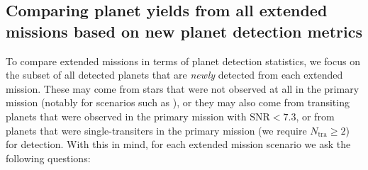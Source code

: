 \subsection{Comparing planet yields from all extended missions based on new planet detection metrics}
\label{sec:results_from_all_extended_missions}
To compare extended missions in terms of planet detection statistics, we focus on the subset of all detected planets that are \textit{newly} detected from each extended mission.
These may come from stars that were not observed at all in the primary mission (notably for scenarios such as \elong), or they may also come from transiting planets that were observed in the primary mission with $\mathrm{SNR}<7.3$, or from planets that were single-transiters in the primary mission (we require $N_\mathrm{tra}\geq2$) for detection.
With this in mind, for each extended mission scenario we ask the following questions:

